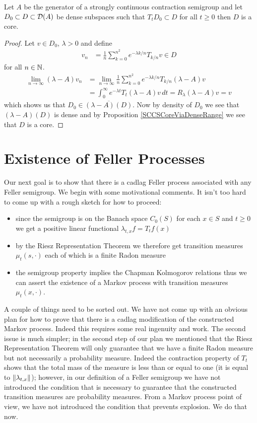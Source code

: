 \begin{prop}\label{SCCSCoreViaInvariance}Let $A$ be the generator of a strongly continuous contraction semigroup and let $D_0 \subset D \subset \mathcal{D}(A)$ be dense subspaces such that $T_t D_0 \subset D$ for all $t \geq 0$ then $D$ is a core.
\end{prop}
\begin{proof}
Let $v \in D_0$, $\lambda > 0$ and define
\begin{align*}
v_n &= \frac{1}{n} \sum_{k=0}^{n^2} e^{-\lambda k/n} T_{k/n} v \in D
\end{align*}
for all $n \in \mathbb{N}$.
\begin{align*}
\lim_{n \to \infty} (\lambda - A) v_n &= \lim_{n \to \infty} \frac{1}{n} \sum_{k=0}^{n^2} e^{-\lambda k/n} T_{k/n}(\lambda - A)  v \\
&=\int_0^\infty e^{-\lambda t} T_t (\lambda -A) v \, dt = R_\lambda (\lambda -A) v = v
\end{align*}
which shows us that $D_0 \in \overline{(\lambda - A)(D)}$.  Now by density of $D_0$ we see that $(\lambda - A)(D)$ is dense and by Proposition \ref{SCCSCoreViaDenseRange} we see that $D$ is a core.
\end{proof}

\section{Existence of Feller Processes}

Our next goal is to show that there is a cadlag Feller process associated with any Feller semigroup.  We begin with some motivational comments.  It isn't too hard to come up with a rough sketch for how to proceed:  
\begin{itemize}
\item since the semigroup is on the Banach space $C_0(S)$ for each $x \in S$ and $t \geq 0$ we get a positive linear functional $\lambda_{t,x} f = T_t f (x)$
\item by the Riesz Representation Theorem we therefore get transition measures $\mu_{t}(s, \cdot)$ each of which is a finite Radon measure
\item the semigroup property implies the Chapman Kolmogorov relations thus we can assert the existence of a Markov process with transition measures $\mu_t(x, \cdot)$.
\end{itemize}
A couple of things need to be sorted out.  We have not come up with an obvious plan for how to prove that there is a cadlag modification of the constructed Markov process.  Indeed
this requires some real ingenuity and work.  The second issue is much simpler; in the second step of our plan we mentioned that the Riesz Representation Theorem will only guarantee that we have a finite Radon measure but not necessarily a probability measure.  Indeed the contraction property of $T_t$ shows that the total mass of the measure is less than or equal to one (it is equal to $\left \lVert \lambda_{t,x} \right \rVert$); however, in our definition of a Feller semigroup we have not introduced the condition that is necessary to guarantee that the constructed transition measures are probability measures.  From a Markov process point of view, we have not introduced the condition that prevents explosion.  We do that now.

